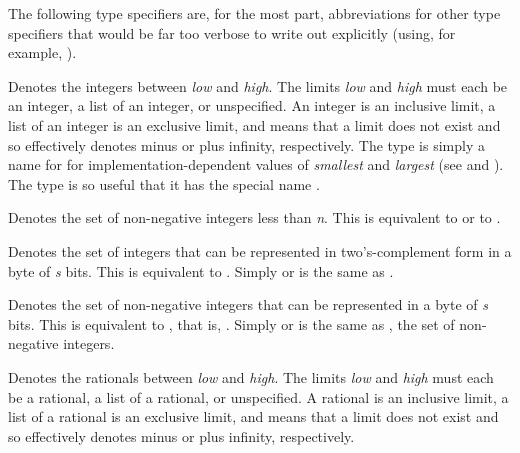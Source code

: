 The following type specifiers are, for the most part,
abbreviations for other type specifiers that would be far too
verbose to write out explicitly (using, for example, ).

\begin{flushdesc}
\item[\cd{(integer {\it low} {\it high})}]
Denotes the integers between
{\it low} and {\it high}.  The limits {\it low} and {\it high}
must each be an integer, a list of an integer, or unspecified.
An integer is an inclusive limit,
a list of an integer is an exclusive limit, and
\cd{*} means that a limit does not exist
and so effectively denotes minus or plus infinity, respectively.
The type  is simply a name
for  for implementation-dependent
values of {\it smallest} and {\it largest}
(see  and ).
The type 
is so useful that it has the special name .

\item[\cd{(mod {\it n})}]
Denotes the set of non-negative integers less than {\it n}.
This is equivalent to 
or to .

\item[\cd{(signed-byte {\it s})}]
Denotes the set of integers that can be represented
in two's-complement form in a byte of {\it s} bits.  This is
equivalent to
.
Simply  or  is the same as .

\item[\cd{(unsigned-byte {\it s})}]
Denotes the set of non-negative integers that can be
represented in a byte of {\it s} bits.  This is equivalent to , that is, .
Simply  or  is the same as
, the set of non-negative integers.

\item[\cd{(rational {\it low} {\it high})}]
Denotes the rationals between
{\it low} and {\it high}.  The limits {\it low} and {\it high}
must each be a rational, a list of a rational, or unspecified.
A rational is an inclusive limit,
a list of a rational is an exclusive limit, and
\cd{*} means that a limit does not exist
and so effectively denotes minus or plus infinity, respectively.


\end{flushdesc}
